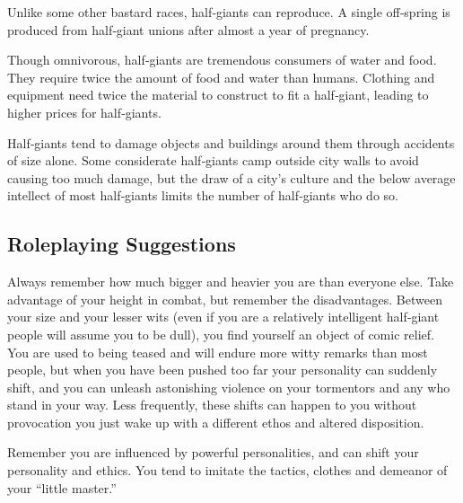 Unlike some other bastard races, half‐giants can reproduce. A single off‐spring is produced from half‐giant unions after almost a year of pregnancy.

Though omnivorous, half‐giants are tremendous consumers of water and food. They require twice the amount of food and water than humans. Clothing and equipment need twice the material to construct to fit a half‐giant, leading to higher prices for half‐giants.

Half‐giants tend to damage objects and buildings around them through accidents of size alone. Some considerate half‐giants camp outside city walls to avoid causing too much damage, but the draw of a city's culture and the below average intellect of most half‐giants limits the number of half‐giants who do so.

\subsection{Roleplaying Suggestions}
Always remember how much bigger and heavier you are than everyone else. Take advantage of your height in combat, but remember the disadvantages. Between your size and your lesser wits (even if you are a relatively intelligent half‐giant people will assume you to be dull), you find yourself an object of comic relief. You are used to being teased and will endure more witty remarks than most people, but when you have been pushed too far your personality can suddenly shift, and you can unleash astonishing violence on your tormentors and any who stand in your way. Less frequently, these shifts can happen to you without provocation you just wake up with a different ethos and altered disposition.

Remember you are influenced by powerful personalities, and can shift your personality and ethics. You tend to imitate the tactics, clothes and demeanor of your ``little master.''
